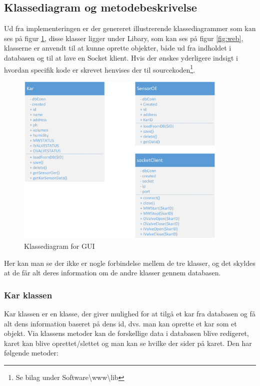 \subsection{Klassediagram og metodebeskrivelse}
Ud fra implementeringen er der genereret illustrerende klassediagrammer som kan ses på figur \ref{fig:GUI_KD}, disse klasser ligger under Libary, som kan ses på figur \ref{fig:web}, klasserne er anvendt til at kunne oprette objekter, både ud fra indholdet i databasen og til at lave en Socket klient. Hvis der ønskes yderligere indsigt i hvordan specifik kode er skrevet henvises der til sourcekoden\footnote{Se bilag under Software\textbackslash www\textbackslash lib}.

\begin{figure}[H]
    \centering
    \includegraphics[width=0.9\textwidth]{SoftwareArkitektur/GUI/KlasseDiagram/photo/klasseDiagram_gui.PNG}
    \caption{Klassediagram for GUI}
    \label{fig:GUI_KD}
\end{figure}

Her kan man se der ikke er nogle forbindelse mellem de tre klasser, og det skyldes at de får alt deres information om de andre klasser gennem databasen.
 
\subsubsection{Kar klassen}
Kar klassen er en klasse, der giver mulighed for at tilgå et kar fra databasen og få alt dens information baseret på dens id, dvs. man kan oprette et kar som et objekt. Via klassens metoder kan de forskellige data i databasen blive redigeret, karet kan blive oprettet/slettet og man kan se hvilke  der sider på karet. Den har følgende metoder:

